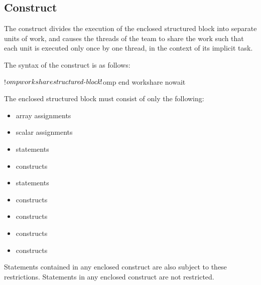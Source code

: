 \begin{fortranspecific}

\subsection{ Construct}
\label{subsec:workshare Construct}
\summary
The  construct divides the execution of the enclosed structured block into
separate units of work, and causes the threads of the team to share the work such that
each unit is executed only once by one thread, in the context of its implicit task.

\syntax
The syntax of the  construct is as follows:

\begin{ompfPragma}
!$omp workshare
    \plc{structured-block}
!$omp end workshare \plc{[}nowait\plc{]}
\end{ompfPragma}

The enclosed structured block must consist of only the following:

\begin{itemize}
\item array assignments

\item scalar assignments

\item {} statements

\item {} constructs

\item {} statements

\item {} constructs

\item {} constructs

\item {} constructs

\item {} constructs
\end{itemize}

Statements contained in any enclosed  construct are also subject to these
restrictions. Statements in any enclosed  construct are not restricted.


\end{fortranspecific}
